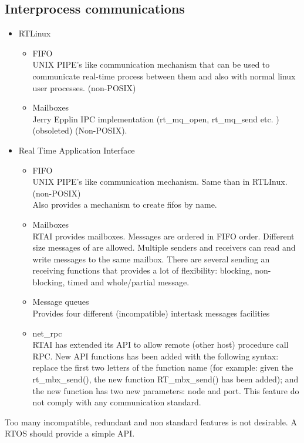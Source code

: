 \documentclass[paper=letter, fontsize=12pt]{article}
\newcommand\rtai{Real Time Application Interface}
\newcommand\rtlinux{RTLinux}
\begin{document}
    
    \subsection{Interprocess communications}
    \begin{itemize}
        \item \rtlinux
        \begin{itemize}
            \item FIFO
            \\ UNIX PIPE's like communication mechanism that can be used to communicate real-time process between them and also with normal linux user processes. (non-POSIX)
            \item Mailboxes
            \\ Jerry Epplin IPC implementation (rt\_mq\_open, rt\_mq\_send etc. ) (obsoleted) (Non-POSIX).
        \end{itemize}
        \item \rtai
        \begin{itemize}
            \item FIFO
            \\ UNIX PIPE's like communication mechanism. Same than in RTLInux. (non-POSIX)
            \\ Also provides a mechanism to create fifos by name.
            \item Mailboxes
            \\ RTAI provides mailboxes. Messages are ordered in FIFO order. Different size messages of are allowed. Multiple senders and receivers can read and write messages to the same mailbox. There are several sending an receiving functions that provides a lot of flexibility: blocking, non-blocking, timed and whole/partial message.
            \item Message queues
            \\Provides four different (incompatible) intertask messages facilities
            \\
            \item net\_rpc
            \\RTAI has extended its API to allow remote (other host) procedure call RPC. New API functions has been added with the following syntax: replace the first two letters of the function name (for example: given the rt\_mbx\_send(), the new function RT\_mbx\_send() has been added); and the new function has two new parameters: node and port. This feature do not comply with any communication standard.
        \end{itemize}
    \end{itemize}
    Too many incompatible, redundant and non standard features is not desirable. A RTOS should provide a simple API.
    
\end{document}
